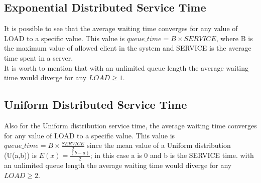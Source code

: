 \documentclass[twocolumn,letterpaper]{report}
\begin{document}
{	 			\subsection{Exponential Distributed Service Time}
It is possible to see that the average waiting time converges for any value of LOAD to a specific value. This value is $queue\_time = B \times SERVICE$, where B is the maximum value of allowed client in the system and SERVICE is the average time spent in a server. \\
It is worth to mention that with an unlimited queue length the average waiting time would diverge for any $LOAD \ge 1$.

						
	 			\subsection{Uniform Distributed Service Time}
	 			Also for the Uniform distribution service time, the average waiting time converges for any value of LOAD to a specific value. This value is $queue\_time = B \times\frac{SERVICE}{2}$ since the mean value of a Uniform distribution (U(a,b)) is $E(x)=\frac{(b-a)}{2}$; in this case a is 0 and b is the SERVICE time. with an unlimited queue length the average waiting time would diverge for any $LOAD \ge 2$.
	 			
						
						
} \fi
\end{document}
